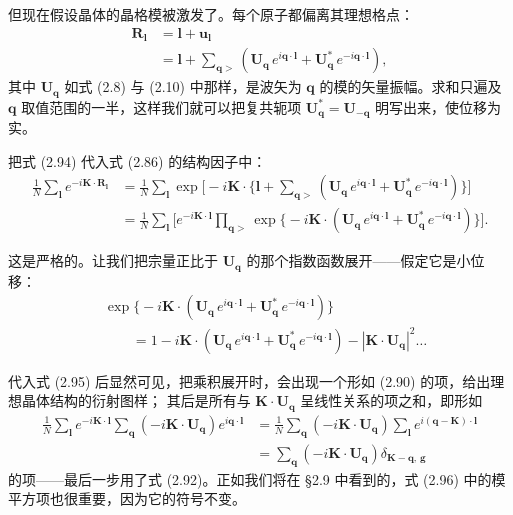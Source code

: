但现在假设晶体的晶格模被激发了。每个原子都偏离其理想格点：
\begin{align*}
\mathbf{R}_{\boldsymbol{l}} &= \boldsymbol{l} + \mathbf{u}_{\boldsymbol{l}} \\
&= \boldsymbol{l} + \sum_{\mathbf{q}>}
\left( \mathbf{U}_{\mathbf{q}}\, e^{i\mathbf{q}\cdot\boldsymbol{l}}
+ \mathbf{U}_{\mathbf{q}}^{*}\, e^{-i\mathbf{q}\cdot\boldsymbol{l}} \right),
\tag{2.94}
\end{align*}
其中 $\mathbf{U}_{\mathbf{q}}$ 如式 (2.8) 与 (2.10)
中那样，是波矢为 $\mathbf{q}$ 的模的矢量振幅。求和只遍及 $\mathbf{q}$
取值范围的一半，这样我们就可以把复共轭项 $\mathbf{U}_{\mathbf{q}}^{*} =
\mathbf{U}_{-\mathbf{q}}$ 明写出来，使位移为实。

把式 (2.94) 代入式 (2.86) 的结构因子中：
\begin{align*}
\frac{1}{N} \sum_{\boldsymbol{l}} e^{-i\mathbf{K}\cdot\mathbf{R}_{\boldsymbol{l}}}
&= \frac{1}{N} \sum_{\boldsymbol{l}} \exp\bigl[ -i\mathbf{K}\cdot
\bigl\{ \boldsymbol{l} + \sum_{\mathbf{q}>}
(\mathbf{U}_{\mathbf{q}}\, e^{i\mathbf{q}\cdot\boldsymbol{l}}
+ \mathbf{U}_{\mathbf{q}}^{*}\, e^{-i\mathbf{q}\cdot\boldsymbol{l}}) \bigr\} \bigr] \\
&= \frac{1}{N} \sum_{\boldsymbol{l}} \bigl[ e^{-i\mathbf{K}\cdot\boldsymbol{l}}
\prod_{\mathbf{q}>} \exp\bigl\{ -i\mathbf{K}\cdot
(\mathbf{U}_{\mathbf{q}}\, e^{i\mathbf{q}\cdot\boldsymbol{l}}
+ \mathbf{U}_{\mathbf{q}}^{*}\, e^{-i\mathbf{q}\cdot\boldsymbol{l}}) \bigr\}
\bigr].
\tag{2.95}
\end{align*}

这是严格的。让我们把宗量正比于 $\mathbf{U}_{\mathbf{q}}$
的那个指数函数展开——假定它是小位移：
\begin{align*}
&\exp \bigl\{ -i\mathbf{K}\cdot
(\mathbf{U}_{\mathbf{q}}\, e^{i\mathbf{q}\cdot\boldsymbol{l}}
+ \mathbf{U}_{\mathbf{q}}^{*}\, e^{-i\mathbf{q}\cdot\boldsymbol{l}}) \bigr\} \\
&\qquad = 1 - i\mathbf{K}\cdot
(\mathbf{U}_{\mathbf{q}}\, e^{i\mathbf{q}\cdot\boldsymbol{l}}
+ \mathbf{U}_{\mathbf{q}}^{*}\, e^{-i\mathbf{q}\cdot\boldsymbol{l}})
- |\mathbf{K}\cdot\mathbf{U}_{\mathbf{q}}|^2 \ldots
\tag{2.96}
\end{align*}

代入式 (2.95) 后显然可见，把乘积展开时，会出现一个形如 (2.90)
的项，给出理想晶体结构的衍射图样；
其后是所有与 $\mathbf{K}\cdot\mathbf{U}_{\mathbf{q}}$
呈线性关系的项之和，即形如
\begin{align*}
\frac{1}{N} \sum_{\boldsymbol{l}} e^{-i\mathbf{K}\cdot\boldsymbol{l}}
\sum_{\mathbf{q}} \left( -i\mathbf{K}\cdot\mathbf{U}_{\mathbf{q}} \right)
e^{i\mathbf{q}\cdot\boldsymbol{l}}
&= \frac{1}{N} \sum_{\mathbf{q}} \left( -i\mathbf{K}\cdot\mathbf{U}_{\mathbf{q}} \right)
\sum_{\boldsymbol{l}} e^{i(\mathbf{q}-\mathbf{K})\cdot\boldsymbol{l}} \\
&= \sum_{\mathbf{q}} \left( -i\mathbf{K}\cdot\mathbf{U}_{\mathbf{q}} \right)
\delta_{\mathbf{K}-\mathbf{q},\,\mathbf{g}}
\tag{2.97}
\end{align*}
的项——最后一步用了式 (2.92)。正如我们将在 §2.9
中看到的，式 (2.96) 中的模平方项也很重要，因为它的符号不变。

